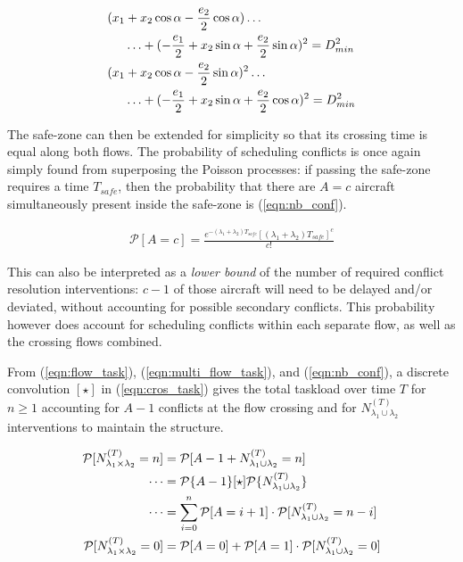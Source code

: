 \documentclass[conference]{IEEEtran}
\begin{document}
\begin{align}
(x_1&+x_2\cos\alpha -\frac{e_2}{2}\cos\alpha )\ldots \notag \\
&\ldots+(-\frac{e_1}{2}+x_2\sin\alpha+\frac{e_2}{2}\sin\alpha )^2 = D_{min}^2\notag\\
(x_1&+x_2\cos\alpha -\frac{e_2}{2}\sin\alpha)^2\ldots\notag \\
&\ldots+(-\frac{e_1}{2}+x_2\sin\alpha+\frac{e_2}{2}\cos\alpha)^2 = D_{min}^2 \label{eqn:safe_bounds}
\end{align}

The safe-zone can then be extended for simplicity so that its crossing time is equal along both flows. The probability of scheduling conflicts is once again simply found from superposing the Poisson processes: if passing the safe-zone requires a time $T_{safe}$, then the probability that there are $A=c$ aircraft simultaneously present inside the safe-zone is (\ref{eqn:nb_conf}).

\begin{align}
\mathcal P[A=c]=\frac{e^{-(\lambda_1+\lambda_2) T_{safe}}[(\lambda_1+\lambda_2) T_{safe}]^c}{c!}\label{eqn:nb_conf}
\end{align}

This can also be interpreted as a \emph{lower bound} of the number of required conflict resolution interventions: $c-1$ of those aircraft will need to be delayed and/or deviated, without accounting for possible secondary conflicts. This probability however does account for scheduling conflicts within each separate flow, as well as the crossing flows combined.

From (\ref{eqn:flow_task}), (\ref{eqn:multi_flow_task}), and (\ref{eqn:nb_conf}), a discrete convolution $[\star]$ in (\ref{eqn:cros_task}) gives the total taskload over time $T$ for $n\ge1$ accounting for $A-1$ conflicts at the flow crossing and for $N^{(T)}_{\lambda_1\cup\lambda_2}$ interventions to maintain the structure.

\begin{align}
\mathcal P[N_{\lambda_1\times\lambda_2}^{(T)}=n]&=\mathcal P[A-1+N_{\lambda_1\cup\lambda_2}^{(T)}=n]\notag \\
\cdots &=\mathcal P\{A-1\}[\star]\mathcal P\{N^{(T)}_{\lambda_1\cup\lambda_2}\}\notag \\
\cdots &=\sum\limits_{i=0}^n \mathcal P[A=i+1]\cdot \mathcal P[N^{(T)}_{\lambda_1\cup\lambda_2}=n-i]\label{eqn:cros_task}\\
\mathcal P[N_{\lambda_1\times\lambda_2}^{(T)}=0]&=\mathcal P[A=0]+\mathcal P[A=1]\cdot\mathcal P[N^{(T)}_{\lambda_1\cup\lambda_2}=0] \notag
\end{align}
\end{document}
